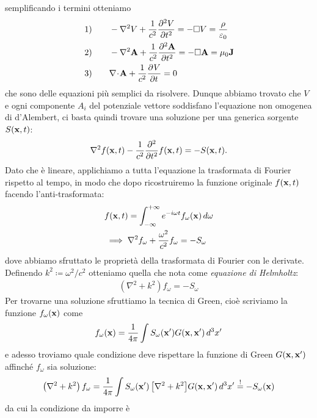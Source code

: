 semplificando i termini otteniamo
\begin{align}
  \left.1\right)\qquad &-\nabla^2V + \frac{1}{c^2} \der[2]{V}{t} =-\Box V = \frac{\rho}{\eps_0}
  \\
  \left.2\right)\qquad &-\nabla^2\v{ A } + \frac{1}{c^2} \der[2]{\v{ A }}{t} =-\Box \v{ A } = \mu_0\v{ J }
  \\
  \left.3\right)\qquad &\nabla\!\cdot\!\v{ A } + \frac{1}{c^2} \der{V}{t} = 0 \label{eq:_condizione_di_Lorenz}
\end{align}
che sono delle equazioni più semplici da risolvere. Dunque abbiamo trovato che $ V $ e ogni componente $ A_i $ del potenziale vettore soddisfano 
l'equazione non omogenea di d'Alembert, ci basta quindi trovare una soluzione per una generica sorgente $ S(\v{ x }, t) $:
\begin{align}
  \nabla^2 f(\v{ x }, t) - \frac{1}{c^2} \der[2]{}{t} f(\v{ x },t) = -S(\v{ x },t).
\end{align}
Dato che è lineare, applichiamo a tutta l'equazione la trasformata di Fourier rispetto al tempo, in modo che dopo ricostruiremo la funzione originale 
$ f(\v{ x }, t) $ facendo l'anti-trasformata:
\begin{align}
  &f(\v{ x },t) = \int_{-\infty}^{+\infty} e^{-i\omega t} f_\omega(\v{ x }) \,d\omega
  \\
  &\implies \nabla^2 f_\omega + \frac{\omega^2}{c^2} f_\omega = -S_\omega
\end{align}
dove abbiamo sfruttato le proprietà della trasformata di Fourier con le derivate. Definendo $ k^2 \coloneqq \omega^2 /c^2 $ otteniamo quella che nota 
come \textit{equazione di Helmholtz}:
\begin{align}
  \left( \nabla^2 + k^2 \right)f_\omega = -S_\omega
\end{align}
Per trovarne una soluzione sfruttiamo la tecnica di Green, cioè scriviamo la funzione $ f_\omega(\v{ x }) $ come
\begin{align}
  f_\omega(\v{ x }) = \frac{1}{4\pi} \int S_\omega(\v{ x }') G(\v{ x }, \v{ x }') \,d^3x'
\end{align}
e adesso troviamo quale condizione deve rispettare la funzione di Green $ G(\v{ x },\v{ x }') $ affinché $ f_\omega $ sia soluzione:
\begin{align}
  \left( \nabla^2 + k^2 \right)f_\omega 
  = \frac{1}{4\pi} \int S_\omega(\v{ x }') \left[ \nabla^2 + k^2 \right]\!G(\v{ x }, \v{ x }') \,d^3x' \overset{!}{=} -S_\omega(\v{ x })
\end{align}
da cui la condizione da imporre è
